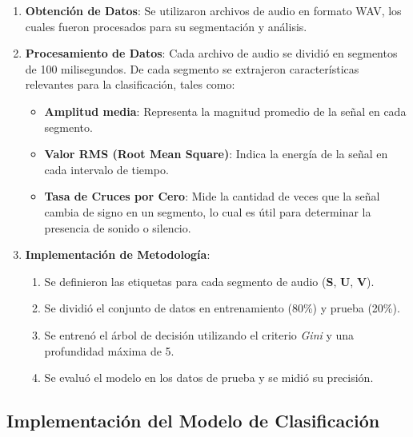 \documentclass{report}
\begin{document}
\begin{enumerate}
    \item \textbf{Obtención de Datos}: Se utilizaron archivos de audio en formato WAV, los cuales fueron procesados para su segmentación y análisis.
    \item \textbf{Procesamiento de Datos}: Cada archivo de audio se dividió en segmentos de 100 milisegundos. De cada segmento se extrajeron características relevantes para la clasificación, tales como:
    \begin{itemize}
        \item \textbf{Amplitud media}: Representa la magnitud promedio de la señal en cada segmento.
        \item \textbf{Valor RMS (Root Mean Square)}: Indica la energía de la señal en cada intervalo de tiempo.
        \item \textbf{Tasa de Cruces por Cero}: Mide la cantidad de veces que la señal cambia de signo en un segmento, lo cual es útil para determinar la presencia de sonido o silencio.
    \end{itemize}
    \item \textbf{Implementación de Metodología}: 
    \begin{enumerate}
        \item Se definieron las etiquetas para cada segmento de audio (\textbf{S}, \textbf{U}, \textbf{V}).
        \item Se dividió el conjunto de datos en entrenamiento (80\%) y prueba (20\%).
        \item Se entrenó el árbol de decisión utilizando el criterio \textit{Gini} y una profundidad máxima de 5.
        \item Se evaluó el modelo en los datos de prueba y se midió su precisión.
    \end{enumerate}
\end{enumerate}

\subsection{Implementación del Modelo de Clasificación}
\end{document}
